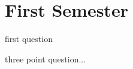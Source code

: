 \documentclass[12pt]{book}
\begin{document}
\part{First Semester}
\label{part:first_sem}


\begin{question}
  first question
\end{question}

\begin{question}{3}
  three point question...
\end{question}
\end{document}
